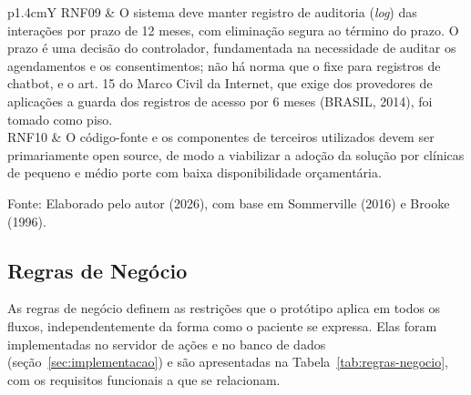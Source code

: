 \documentclass[12pt,a4paper]{extarticle}
\begin{document}
\begin{xltabular}{\textwidth}{p{1.4cm}Y}
RNF09 & O sistema deve manter registro de auditoria (\textit{log}) das interações por prazo de 12 meses, com eliminação segura ao término do prazo. O prazo é uma decisão do controlador, fundamentada na necessidade de auditar os agendamentos e os consentimentos; não há norma que o fixe para registros de chatbot, e o art. 15 do Marco Civil da Internet, que exige dos provedores de aplicações a guarda dos registros de acesso por 6 meses (BRASIL, 2014), foi tomado como piso. \\
RNF10 & O código-fonte e os componentes de terceiros utilizados devem ser primariamente open source, de modo a viabilizar a adoção da solução por clínicas de pequeno e médio porte com baixa disponibilidade orçamentária. \\
\end{xltabular}
\vspace{0.3cm}

\footnotesize{Fonte: Elaborado pelo autor (2026), com base em Sommerville (2016) e Brooke (1996).}


\subsection{Regras de Negócio}
\label{sec:regras-negocio}

As regras de negócio definem as restrições que o protótipo aplica em todos os fluxos, independentemente da forma como o paciente se expressa. Elas foram implementadas no servidor de ações e no banco de dados (seção~\ref{sec:implementacao}) e são apresentadas na Tabela~\ref{tab:regras-negocio}, com os requisitos funcionais a que se relacionam.
\end{document}
